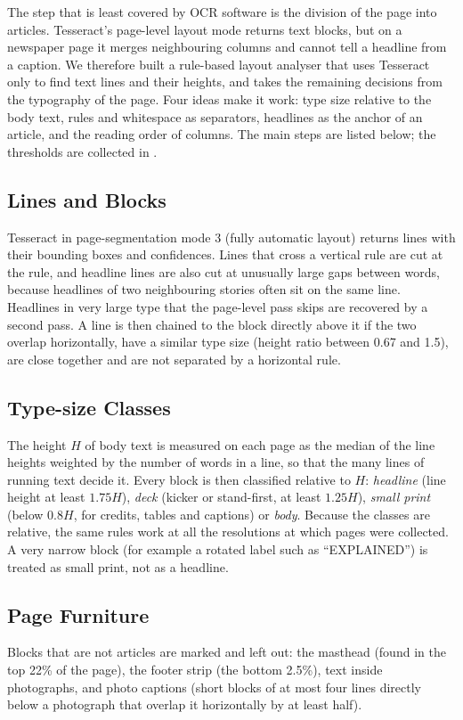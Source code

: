 The step that is least covered by OCR software is the division of the page into articles. Tesseract's page-level layout mode returns text blocks, but on a newspaper page it merges neighbouring columns and cannot tell a headline from a caption. We therefore built a rule-based layout analyser that uses Tesseract only to find text lines and their heights, and takes the remaining decisions from the typography of the page. Four ideas make it work: type size relative to the body text, rules and whitespace as separators, headlines as the anchor of an article, and the reading order of columns. The main steps are listed below; the thresholds are collected in .

\subsection{Lines and Blocks}
Tesseract in page-segmentation mode 3 (fully automatic layout) returns lines with their bounding boxes and confidences. Lines that cross a vertical rule are cut at the rule, and headline lines are also cut at unusually large gaps between words, because headlines of two neighbouring stories often sit on the same line. Headlines in very large type that the page-level pass skips are recovered by a second pass. A line is then chained to the block directly above it if the two overlap horizontally, have a similar type size (height ratio between 0.67 and 1.5), are close together and are not separated by a horizontal rule.

\subsection{Type-size Classes}
The height $H$ of body text is measured on each page as the median of the line heights weighted by the number of words in a line, so that the many lines of running text decide it. Every block is then classified relative to $H$: \emph{headline} (line height at least $1.75H$), \emph{deck} (kicker or stand-first, at least $1.25H$), \emph{small print} (below $0.8H$, for credits, tables and captions) or \emph{body}. Because the classes are relative, the same rules work at all the resolutions at which pages were collected. A very narrow block (for example a rotated label such as ``EXPLAINED'') is treated as small print, not as a headline.

\subsection{Page Furniture}
Blocks that are not articles are marked and left out: the masthead (found in the top 22\% of the page), the footer strip (the bottom 2.5\%), text inside photographs, and photo captions (short blocks of at most four lines directly below a photograph that overlap it horizontally by at least half).


